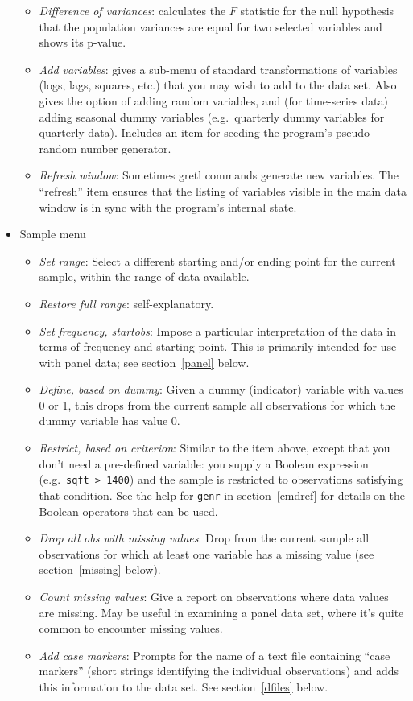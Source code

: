 \documentclass{article}
\begin{document}
\begin{itemize}
\begin{itemize}
  \item \textit{Difference of variances}: calculates the $F$ statistic
    for the null hypothesis that the population variances are equal for
    two selected variables and shows its p-value.
  \item \textit{Add variables}: gives a sub-menu of standard
    transformations of variables (logs, lags, squares, etc.) that you
    may wish to add to the data set.  Also gives the option of adding
    random variables, and (for time-series data) adding seasonal dummy
    variables (e.g.\ quarterly dummy variables for quarterly data).
    Includes an item for seeding the program's pseudo-random number
    generator.  
  \item \textit{Refresh window}: Sometimes \textsf{gretl} commands
    generate new variables.  The ``refresh'' item ensures that the
    listing of variables visible in the main data window is in sync
    with the program's internal state.
  \end{itemize}

\item \textsf{Sample menu}
  \begin{itemize}
  \item \textit{Set range}: Select a different starting and/or
    ending point for the current sample, within the range of data
    available. 
  \item \textit{Restore full range}: self-explanatory.
  \item \textit{Set frequency, startobs}: Impose a particular
    interpretation of the data in terms of frequency and starting
    point.  This is primarily intended for use with panel data; see
    section~\ref{panel} below.  
  \item \textit{Define, based on dummy}: Given a dummy (indicator)
    variable with values 0 or 1, this drops from the current sample
    all observations for which the dummy variable has value 0.
  \item \textit{Restrict, based on criterion}: Similar to the item
    above, except that you don't need a pre-defined variable: you
    supply a Boolean expression (e.g.\ \texttt{sqft > 1400}) and the
    sample is restricted to observations satisfying that condition.
    See the help for \texttt{genr} in section~\ref{cmdref} for details
    on the Boolean operators that can be used.
  \item \textit{Drop all obs with missing values}: Drop from the
    current sample all observations for which at least one variable
    has a missing value (see section~\ref{missing} below).
  \item \textit{Count missing values}: Give a report on observations
    where data values are missing.  May be useful in examining a panel
    data set, where it's quite common to encounter missing values.
  \item \textit{Add case markers}: Prompts for the name of a text file
    containing ``case markers'' (short strings identifying the
    individual observations) and adds this information to the data
    set.  See section~\ref{dfiles} below.
  \end{itemize}


\end{itemize}
\end{document}
